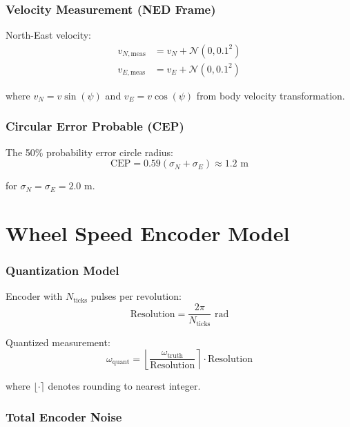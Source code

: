 \documentclass[11pt,a4paper]{article}
\begin{document}
\subsubsection{Velocity Measurement (NED Frame)}

North-East velocity:
\begin{align}
v_{N,\text{meas}} &= v_N + \mathcal{N}(0, 0.1^2) \\
v_{E,\text{meas}} &= v_E + \mathcal{N}(0, 0.1^2)
\end{align}

where $v_N = v \sin(\psi)$ and $v_E = v \cos(\psi)$ from body velocity transformation.

\subsubsection{Circular Error Probable (CEP)}

The 50\% probability error circle radius:
\begin{equation}
\text{CEP} = 0.59(\sigma_N + \sigma_E) \approx 1.2 \text{ m}
\end{equation}

for $\sigma_N = \sigma_E = 2.0$ m.

\section{Wheel Speed Encoder Model}

\subsubsection{Quantization Model}

Encoder with $N_{\text{ticks}}$ pulses per revolution:
\begin{equation}
\text{Resolution} = \frac{2\pi}{N_{\text{ticks}}} \text{ rad}
\end{equation}

Quantized measurement:
\begin{equation}
\omega_{\text{quant}} = \left\lfloor \frac{\omega_{\text{truth}}}{\text{Resolution}} \right\rceil \cdot \text{Resolution}
\end{equation}

where $\lfloor \cdot \rceil$ denotes rounding to nearest integer.

\subsubsection{Total Encoder Noise}
\end{document}
